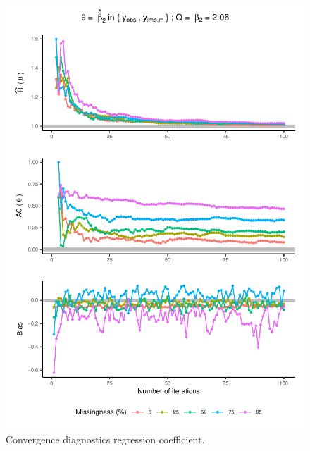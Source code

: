 \documentclass[Royal,times,sageh]{sagej}
\begin{document}
\begin{figure}

{\centering \includegraphics{manuscript_files/figure-latex/est-1} 

}

\caption{Convergence diagnostics regression coefficient.}\label{fig:est}
\end{figure}
\end{document}
